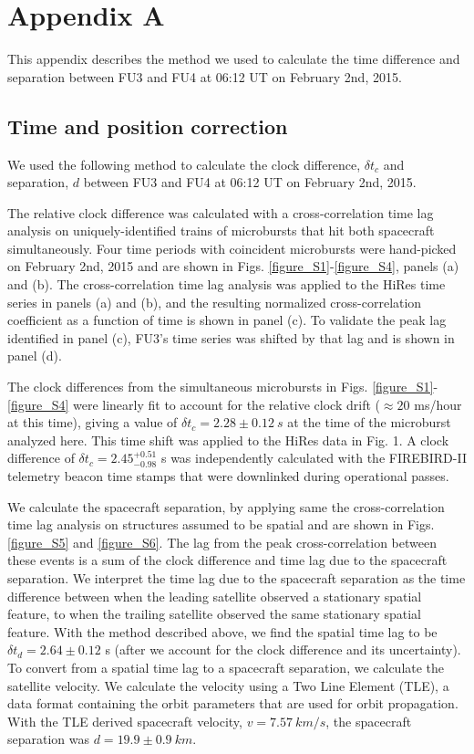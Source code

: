 
\chapter{Appendix A}\label{appendixa}
This appendix describes the method we used to calculate the time difference and separation between FU3 and FU4 at 06:12 UT on February 2nd, 2015.

\section{Time and position correction} 

We used the following method to calculate the clock difference, $\delta t_{c}$  and separation, $d$ between FU3 and FU4 at 06:12 UT on February 2nd, 2015.

The relative clock difference was calculated with a cross-correlation time lag analysis on uniquely-identified trains of microbursts that hit both spacecraft simultaneously. Four time periods with coincident microbursts were hand-picked on February 2nd, 2015 and are shown in Figs. \ref{figure_S1}-\ref{figure_S4}, panels (a) and (b). The cross-correlation time lag analysis was applied to the HiRes time series in panels (a) and (b), and the resulting normalized cross-correlation coefficient as a function of time is shown in panel (c). To validate the peak lag identified in panel (c), FU3's time series was shifted by that lag and is shown in panel (d).

The clock differences from the simultaneous microbursts in Figs. \ref{figure_S1}-\ref{figure_S4} were linearly fit to account for the relative clock drift (${\approx} 20$ ms/hour at this time), giving a value of $\delta t_{c} = 2.28 \pm 0.12 \ s$ at the time of the microburst analyzed here. This time shift was applied to the HiRes data in Fig. 1. A clock difference of $\delta t_{c}  = 2.45^{+ 0.51}_{-0.98}$ s was independently calculated with the FIREBIRD-II telemetry beacon time stamps that were downlinked during operational passes.

We calculate the spacecraft separation, by applying same the cross-correlation time lag analysis on structures assumed to be spatial and are shown in Figs. \ref{figure_S5} and \ref{figure_S6}. The lag from the peak cross-correlation between these events is a sum of the clock difference and time lag due to the spacecraft separation. We interpret the time lag due to the spacecraft separation as the time difference between when the leading satellite observed a stationary spatial feature, to when the trailing satellite observed the same stationary spatial feature. With the method described above, we find the spatial time lag to be $\delta t_{d} = 2.64 \pm 0.12$ s (after we account for the clock difference and its uncertainty). To convert from a spatial time lag to a spacecraft separation, we calculate the satellite velocity. We calculate the velocity using a Two Line Element (TLE), a data format containing the orbit parameters that are used for orbit propagation. With the TLE derived spacecraft velocity, $v = 7.57 \ km/s$, the spacecraft separation was $d = 19.9 \pm 0.9 \ km $.

